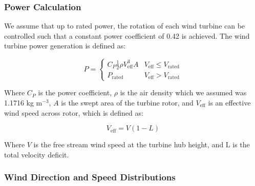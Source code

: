 \subsubsection{Power Calculation}
We assume that up to rated power, the rotation of each wind turbine can be controlled such that a constant power coefficient of 0.42 is achieved. The wind turbine power generation is defined as:

\begin{equation}
P = 
\begin{cases} 
      C_P\frac{1}{2}\rho V_{\text{eff}}^3A & V_{\text{eff}}\leq V_{\text{rated}} \\
      P_{\text{rated}} & V_{\text{eff}} > V_{\text{rated}}
   \end{cases}
\end{equation}

\noindent Where $C_P$ is the power coefficient, $\rho$ is the air density which we assumed was 1.1716 kg m$^{-3}$, $A$ is the swept area of the turbine rotor, and $V_{\text{eff}}$ is an effective wind speed across rotor, which is defined as:

\begin{equation}
V_{\text{eff}} = V(1-L)
\end{equation}

\noindent Where $V$ is the free stream wind speed at the turbine hub height, and L is the total velocity deficit.




\subsubsection{Wind Direction and Speed Distributions}

